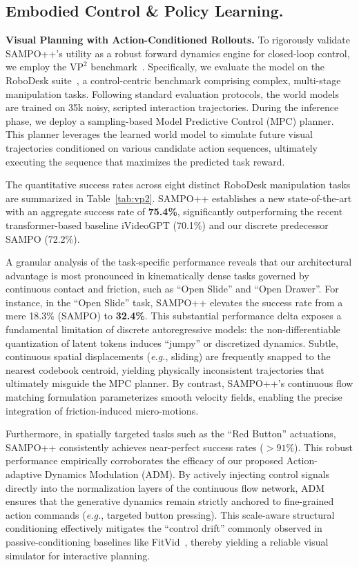 \subsection{Embodied Control \& Policy Learning.}

\textbf{Visual Planning with Action-Conditioned Rollouts.}
To rigorously validate SAMPO++'s utility as a robust forward dynamics engine for closed-loop control, we employ the $\text{VP}^2$ benchmark~\cite{tian2023control}. Specifically, we evaluate the model on the RoboDesk suite~\cite{kannan2021robodesk}, a control-centric benchmark comprising complex, multi-stage manipulation tasks. Following standard evaluation protocols, the world models are trained on 35k noisy, scripted interaction trajectories. During the inference phase, we deploy a sampling-based Model Predictive Control (MPC) planner. This planner leverages the learned world model to simulate future visual trajectories conditioned on various candidate action sequences, ultimately executing the sequence that maximizes the predicted task reward. 

The quantitative success rates across eight distinct RoboDesk manipulation tasks are summarized in Table~\ref{tab:vp2}. SAMPO++ establishes a new state-of-the-art with an aggregate success rate of \textbf{75.4\%}, significantly outperforming the recent transformer-based baseline iVideoGPT (70.1\%) and our discrete predecessor SAMPO (72.2\%). 

A granular analysis of the task-specific performance reveals that our architectural advantage is most pronounced in kinematically dense tasks governed by continuous contact and friction, such as ``Open Slide'' and ``Open Drawer''. For instance, in the ``Open Slide'' task, SAMPO++ elevates the success rate from a mere 18.3\% (SAMPO) to \textbf{32.4\%}. This substantial performance delta exposes a fundamental limitation of discrete autoregressive models: the non-differentiable quantization of latent tokens induces ``jumpy'' or discretized dynamics. Subtle, continuous spatial displacements (\textit{e.g.}, sliding) are frequently snapped to the nearest codebook centroid, yielding physically inconsistent trajectories that ultimately misguide the MPC planner. By contrast, SAMPO++'s continuous flow matching formulation parameterizes smooth velocity fields, enabling the precise integration of friction-induced micro-motions.

Furthermore, in spatially targeted tasks such as the ``Red Button'' actuations, SAMPO++ consistently achieves near-perfect success rates ($>91\%$). This robust performance empirically corroborates the efficacy of our proposed Action-adaptive Dynamics Modulation (ADM). By actively injecting control signals directly into the normalization layers of the continuous flow network, ADM ensures that the generative dynamics remain strictly anchored to fine-grained action commands (\textit{e.g.}, targeted button pressing). This scale-aware structural conditioning effectively mitigates the ``control drift'' commonly observed in passive-conditioning baselines like FitVid~\cite{babaeizadeh2021fitvid}, thereby yielding a reliable visual simulator for interactive planning.


